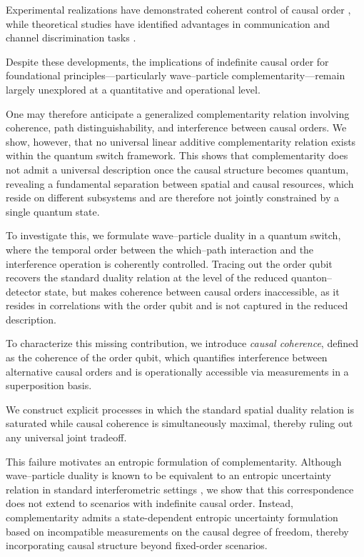 \documentclass[aps,pra,reprint,superscriptaddress]{revtex4-2}
\begin{document}
Experimental realizations have demonstrated coherent control
of causal order \cite{Procopio2015,Rubino2017,Goswami2018,
Goswami2020,Deng2025}, while theoretical studies have identified
advantages in communication and channel discrimination tasks
\cite{Chiribella2012,Ebler2018,Chiribella2021}.

Despite these developments, the implications of indefinite causal
order for foundational principles---particularly wave--particle
complementarity---remain largely unexplored at a quantitative
and operational level.

One may therefore anticipate a generalized complementarity relation
involving coherence, path distinguishability, and interference between
causal orders. We show, however, that no universal linear additive
complementarity relation exists within the quantum switch framework.
This shows that complementarity does not admit a universal description once the causal structure becomes quantum, revealing a fundamental separation between spatial and causal resources, which reside on different subsystems and are therefore not jointly constrained by a single quantum state.

To investigate this, we formulate wave--particle duality in a quantum
switch, where the temporal order between the which--path interaction
and the interference operation is coherently controlled. Tracing out
the order qubit recovers the standard duality relation at the level of
the reduced quanton--detector state, but makes coherence between causal
orders inaccessible, as it resides in correlations with the order qubit
and is not captured in the reduced description.

To characterize this missing contribution, we introduce \emph{causal
coherence}, defined as the coherence of the order qubit, which
quantifies interference between alternative causal orders and is
operationally accessible via measurements in a superposition basis.

We construct explicit processes in which the standard spatial duality
relation is saturated while causal coherence is simultaneously maximal,
thereby ruling out any universal joint tradeoff.

This failure motivates an entropic formulation of complementarity.
Although wave--particle duality is known to be equivalent to an entropic
uncertainty relation in standard interferometric settings
\cite{Coles2014,Coles2017}, we show that this correspondence does not
extend to scenarios with indefinite causal order. Instead,
complementarity admits a state-dependent entropic uncertainty
formulation based on incompatible measurements on the causal degree of
freedom, thereby incorporating causal structure beyond fixed-order
scenarios.
\end{document}
